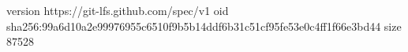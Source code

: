 version https://git-lfs.github.com/spec/v1
oid sha256:99a6d10a2e99976955c6510f9b5b14ddf6b31c51cf95fe53e0c4ff1f66e3bd44
size 87528
